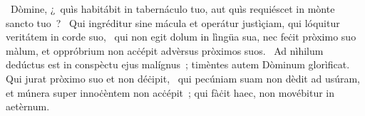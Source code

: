 ~Dòmine, ¿~quìs habitábit in tabernáculo tuo, aut quìs requiéscet in mònte sancto tuo~? 
~Qui ingréditur sine mácula et operátur justìçiam, qui lóquitur veritátem in corde suo, 
~qui non egit dolum in lìngüa sua, nec feċit pròximo suo màlum, et oppróbrium non acċépit advèrsus pròximos suos. 
~Ad nìhilum dedúctus est in conspèctu ejus malígnus~; timèntes autem Dòminum glorìficat. Qui jurat pròximo suo et non déċipit, 
~qui pecúniam suam non dèdit ad usúram, et múnera super innoċèntem non acċépit~; qui fàċit haec, non movébitur in aetèrnum. 

